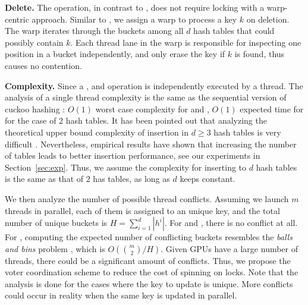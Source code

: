 \vspace{1mm}\noindent\textbf{Delete.} The  operation, in contrast to , does not require locking with a warp-centric approach. 
Similar to , we assign a warp to process a key $k$ on deletion. The warp iterates through the buckets among all $d$ hash tables that could possibly contain $k$. Each thread lane in the warp is responsible for inspecting one position in a bucket independently, and only erase the key if $k$ is found, 
thus causes no contention.



\vspace{1mm}\noindent\textbf{Complexity.}
Since a ,  and  operation is independently executed by a thread. 
The analysis of a single thread complexity is the same as the sequential version of cuckoo hashing \cite{pagh2004cuckoo}: $O(1)$ worst case complexity for  and , $O(1)$ expected time for  for the case of 2 hash tables. 
It has been pointed out that analyzing the theoretical upper bound complexity of insertion in $d \geq 3$ hash tables is very difficult \cite{alcantara2009real}.  
Nevertheless, empirical results have shown that increasing the number of tables leads to better insertion performance, see our experiments in Section~\ref{sec:exp}.
Thus, we assume the complexity for inserting to $d$ hash tables is the same as that of $2$ has tables, as long as $d$ keeps constant.  

We then analyze the number of possible thread conflicts. Assuming we launch $m$ threads in parallel, each of them is assigned to an unique key, and the total number of unique buckets is $H=\sum_{i=1}^d|h^i|$. For  and , there is no conflict at all. 
For , computing the expected number of conflicting buckets resembles the \emph{balls and bins} problem \cite{raab1998balls}, which is $O(\binom{m}{2}/H)$. 
Given GPUs have a large number of threads, there could be a significant amount of conflicts. Thus, we propose the voter coordination scheme to reduce the cost of spinning on locks. Note that the analysis is done for the cases where the key to update is unique. More conflicts could occur in reality when the same key is updated in parallel. 